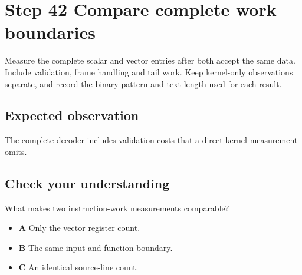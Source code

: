 \section{Step 42 Compare complete work boundaries}\label{base64-s42}

Measure the complete scalar and vector entries after both accept the same data. Include validation, frame handling and tail work. Keep kernel-only observations separate, and record the binary pattern and text length used for each result.

\subsection{Expected observation}
The complete decoder includes validation costs that a direct kernel measurement omits.

\subsection{Check your understanding}
What makes two instruction-work measurements comparable?

\begin{itemize}
  \item \textbf{A} Only the vector register count.
  \item \textbf{B} The same input and function boundary.
  \item \textbf{C} An identical source-line count.
\end{itemize}
